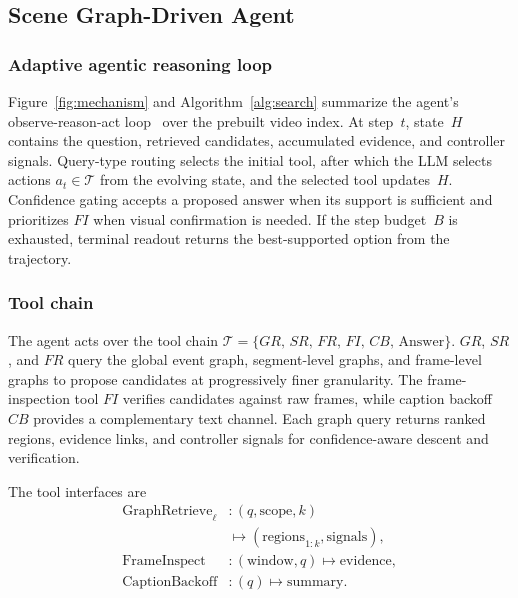 \documentclass[11pt]{article}
\begin{document}
\subsection{Scene Graph-Driven Agent}
\label{sec:agent}

\subsubsection{Adaptive agentic reasoning loop}
Figure~\ref{fig:mechanism} and Algorithm~\ref{alg:search} summarize the agent's observe-reason-act loop~\cite{react2022} over the prebuilt video index.
At step~$t$, state~$H$ contains the question, retrieved candidates, accumulated evidence, and controller signals.
Query-type routing selects the initial tool, after which the LLM selects actions $a_t \in \mathcal{T}$ from the evolving state, and the selected tool updates~$H$.
Confidence gating accepts a proposed answer when its support is sufficient and prioritizes $FI$ when visual confirmation is needed.
If the step budget~$B$ is exhausted, terminal readout returns the best-supported option from the trajectory.

\subsubsection{Tool chain}
The agent acts over the tool chain $\mathcal{T}=\{GR,\,\allowbreak SR,\,\allowbreak FR,\,\allowbreak FI,\,\allowbreak CB,\,\allowbreak \mathrm{Answer}\}$.
$GR$, $SR$, and $FR$ query the global event graph, segment-level graphs, and frame-level graphs to propose candidates at progressively finer granularity.
The frame-inspection tool $FI$ verifies candidates against raw frames, while caption backoff $CB$ provides a complementary text channel.
Each graph query returns ranked regions, evidence links, and controller signals for confidence-aware descent and verification.

The tool interfaces are
\[
\begin{aligned}
\mathrm{GraphRetrieve}_{\ell}&:(q,\mathrm{scope},k)\\
  &\mapsto(\mathrm{regions}_{1:k},\mathrm{signals}),\\
\mathrm{FrameInspect}&:(\mathrm{window},q)\mapsto\mathrm{evidence},\\
\mathrm{CaptionBackoff}&:(q)\mapsto\mathrm{summary}.
\end{aligned}
\]
\end{document}
